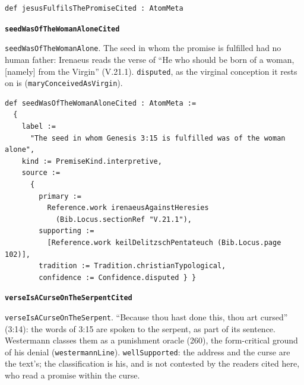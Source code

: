 \documentclass[11pt]{article}
\begin{document}
{\small\begin{verbatim}
def jesusFulfilsThePromiseCited : AtomMeta
\end{verbatim}}
\par\medskip\noindent\textbf{\texttt{seed\allowbreak{}Was\allowbreak{}Of\allowbreak{}The\allowbreak{}Woman\allowbreak{}Alone\allowbreak{}Cited}}\par\nobreak\noindent
\texttt{seed\allowbreak{}Was\allowbreak{}Of\allowbreak{}The\allowbreak{}Woman\allowbreak{}Alone}. The seed in whom the promise is fulfilled had no human father: Irenaeus reads the verse of “He who should be born of a woman, [namely] from the Virgin” (V.21.1). \texttt{disputed}, as the virginal conception it rests on is (\texttt{mary\allowbreak{}Conceived\allowbreak{}As\allowbreak{}Virgin}).

{\small\begin{verbatim}
def seedWasOfTheWomanAloneCited : AtomMeta :=
  {
    label :=
      "The seed in whom Genesis 3:15 is fulfilled was of the woman alone",
    kind := PremiseKind.interpretive,
    source :=
      {
        primary :=
          Reference.work irenaeusAgainstHeresies
            (Bib.Locus.sectionRef "V.21.1"),
        supporting :=
          [Reference.work keilDelitzschPentateuch (Bib.Locus.page 102)],
        tradition := Tradition.christianTypological,
        confidence := Confidence.disputed } }
\end{verbatim}}
\par\medskip\noindent\textbf{\texttt{verse\allowbreak{}Is\allowbreak{}ACurse\allowbreak{}On\allowbreak{}The\allowbreak{}Serpent\allowbreak{}Cited}}\par\nobreak\noindent
\texttt{verse\allowbreak{}Is\allowbreak{}ACurse\allowbreak{}On\allowbreak{}The\allowbreak{}Serpent}. “Because thou hast done this, thou art cursed” (3:14): the words of 3:15 are spoken to the serpent, as part of its sentence. Westermann classes them as a punishment oracle (260), the form-critical ground of his denial (\texttt{westermann\allowbreak{}Line}). \texttt{well\allowbreak{}Supported}: the address and the curse are the text’s; the classification is his, and is not contested by the readers cited here, who read a promise within the curse.
\end{document}
